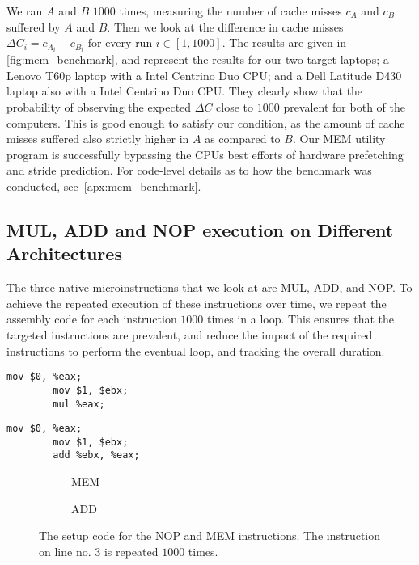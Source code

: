We ran \(A\) and \(B\) \(1000\) times, measuring the number of cache misses \(c_A\) and \(c_B\) suffered by \(A\) and \(B\).
Then we look at the difference in cache misses \(\Delta C_i = c_{A_i} - c_{B_i}\) for every run \(i \in [1, 1000]\).
The results are given in \autoref{fig:mem_benchmark}, and represent the results for our two target laptops; a Lenovo T60p laptop with a Intel Centrino Duo \gls{CPU}; and a Dell Latitude D430 laptop also with a Intel Centrino Duo \gls{CPU}.
They clearly show that the probability of observing the expected \(\Delta C\) close to \(1000\) prevalent for both of the computers.
This is good enough to satisfy our condition, as the amount of cache misses suffered also strictly higher in \(A\) as compared to \(B\).
Our MEM utility program is successfully bypassing the \gls{CPU}s best efforts of hardware prefetching and stride prediction.
For code-level details as to how the benchmark was conducted, see~\autoref{apx:mem_benchmark}.




\subsection{MUL, ADD and NOP execution on Different Architectures}\label{chp4:subsec:MUL_ADD_NOP_instructions}
The three native microinstructions that we look at are MUL, ADD, and NOP.
To achieve the repeated execution of these instructions over time, we repeat the assembly code for each instruction \(1000\) times in a loop.
This ensures that the targeted instructions are prevalent, and reduce the impact of the required instructions to perform the eventual loop, and tracking the overall duration.

\newsavebox{\MEMfigure}
	\begin{lrbox}{\MEMfigure}%
	\begin{lstlisting}[language={[x86masm]Assembler}]
		mov $0, %eax;
		mov $1, $ebx;
		mul %eax;
	\end{lstlisting}
\end{lrbox}

\newsavebox{\ADDfigure}
	\begin{lrbox}{\ADDfigure}%
	\begin{lstlisting}[language={[x86masm]Assembler}]
		mov $0, %eax;
		mov $1, $ebx;
		add %ebx, %eax;
	\end{lstlisting}
\end{lrbox}

\begin{figure}[h]
    \begin{subfigure}{0.5\textwidth}
        \centering
        \usebox{\MEMfigure}
        \caption{MEM}
    \end{subfigure}
    \begin{subfigure}{0.5\textwidth}
        \centering
        \usebox{\ADDfigure}
        \caption{ADD}
    \end{subfigure}
	\caption{The setup code for the NOP and MEM instructions. The instruction on line no. 3 is repeated \(1000\) times.}
	\label{lst:x86_add_mem}
\end{figure}

